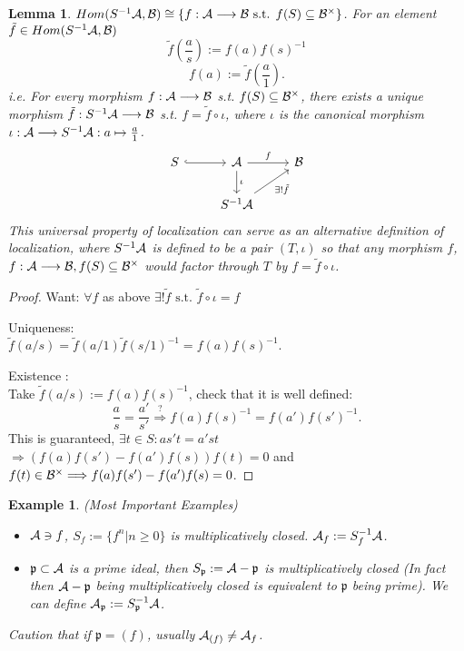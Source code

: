\documentclass[11pt]{article}
\newtheorem{lemma}[thm]{Lemma}
\newtheorem{ex}[thm]{Example}
\newcommand{\scp}{{\mathfrak p}}
\newcommand{\cala}{{\cal A}}
\newcommand{\calb}{{\cal B}}
\newcommand{\Lrta}{\Longrightarrow}
\newcommand{\lrta}{\longrightarrow}
\begin{document}
\begin{lemma}
$Hom(S^{-1}\cala,\calb)\cong \{f:\cala\lrta \calb\text{ s.t. } f(S)\subseteq \calb^{\times}\}$. 
For an element $\tilde{f}\in Hom(S^{-1}\cala,\calb)$
$$
\tilde{f}\left(\frac{a}{s}\right):=f(a)f(s)^{-1}
$$
$$
f(a):=\tilde{f}\left(\frac{a}{1}\right).
$$
i.e. For every morphism $f:\cala\lrta\calb$ s.t. $f(S)\subseteq \calb^{\times}$, there exists a unique morphism $\tilde{f}:S^{-1}\cala\lrta \calb$ s.t. $f=\tilde{f}\circ\iota$, where $\iota $ is the canonical morphism $\iota:\cala\lrta S^{-1}\cala:a\mapsto \frac{a}{1}$.
\[
\begin{tikzcd}
S\ar[r,hook] &\cala  \arrow[r,"f"] \arrow[d,"\iota"] & \calb \\
&S^{-1}\cala\arrow[ur,swap,"\exists !\tilde{f}"]  &    
\end{tikzcd}
\]
This universal property of localization can serve as an alternative definition of localization, where $S^{-1}\cala$ is defined to be a pair $(T,\iota)$ so that any morphism $f$, $f:\cala\lrta \calb,f(S)\subseteq\calb^\times$ would factor through $T$ by $f=\tilde{f}\circ\iota$.
\end{lemma}
\begin{proof}
Want: $\forall f$ as above $\exists ! \tilde{f}\text{ s.t. } \tilde{f}\circ\iota=f$

Uniqueness:\\
$\tilde{f}(a/s)=\tilde{f}(a/1)\tilde{f}(s/1)^{-1}=f(a)f(s)^{-1}$.

Existence :\\
Take $\tilde{f}(a/s):=f(a)f(s)^{-1}$, check that it is well defined:
$$
\frac{a}{s}=\frac{a'}{s'}\overset{?}{\Lrta} f(a)f(s)^{-1}=f(a')f(s')^{-1}.
$$
This is guaranteed, $\exists t\in S: as' t=a's t$ $\Lrta (f(a)f(s')-f(a')f(s))f(t)=0$ and $f(t)\in \calb^{\times}\Lrta f(a)f(s')-f(a')f(s)=0$.
\end{proof}

\begin{ex}
(Most Important Examples)
\begin{itemize}
    \item 
    $\cala\ni f$, $S_f:=\{f^n|n\geq 0\}$ is multiplicatively closed. $\cala_f:=S^{-1}_f\cala$.
    \item
    $\scp\subset \cala$ is a prime ideal, then $S_\scp:=\cala-\scp$ is multiplicatively closed (In fact then $\cala-\scp$ being multiplicatively closed is equivalent to $\scp$ being prime). We can define 
    $\cala_{\scp}:=S_{\scp}^{-1}\cala$.
\end{itemize}
Caution that if $\scp=(f)$, usually $\cala_{(f)}\neq \cala_{f}$.
\end{ex}
\end{document}
